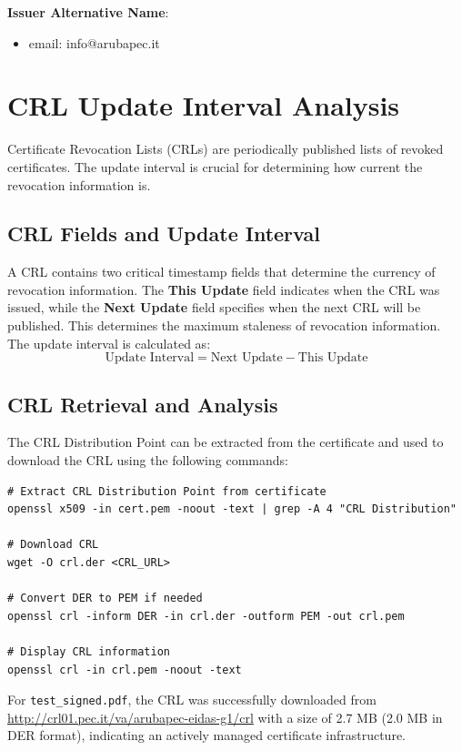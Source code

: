 \documentclass[12pt,a4paper]{article}
\begin{document}
\textbf{Issuer Alternative Name}:
\begin{itemize}
    \item email: info@arubapec.it
\end{itemize}

\section{CRL Update Interval Analysis}

Certificate Revocation Lists (CRLs) are periodically published lists of revoked certificates. The update interval is crucial for determining how current the revocation information is.

\subsection{CRL Fields and Update Interval}

A CRL contains two critical timestamp fields that determine the currency of revocation information. The \textbf{This Update} field indicates when the CRL was issued, while the \textbf{Next Update} field specifies when the next CRL will be published. This determines the maximum staleness of revocation information. The update interval is calculated as:
\[
\text{Update Interval} = \text{Next Update} - \text{This Update}
\]

\subsection{CRL Retrieval and Analysis}

The CRL Distribution Point can be extracted from the certificate and used to download the CRL using the following commands:

\begin{lstlisting}[style=bashstyle, caption={Downloading and analyzing CRL}]
# Extract CRL Distribution Point from certificate
openssl x509 -in cert.pem -noout -text | grep -A 4 "CRL Distribution"

# Download CRL
wget -O crl.der <CRL_URL>

# Convert DER to PEM if needed
openssl crl -inform DER -in crl.der -outform PEM -out crl.pem

# Display CRL information
openssl crl -in crl.pem -noout -text
\end{lstlisting}

For \texttt{test\_signed.pdf}, the CRL was successfully downloaded from \url{http://crl01.pec.it/va/arubapec-eidas-g1/crl} with a size of 2.7 MB (2.0 MB in DER format), indicating an actively managed certificate infrastructure.
\end{document}
